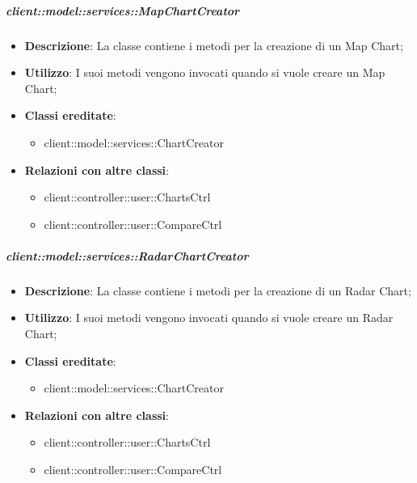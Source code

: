 		\subparagraph{client::model::services::MapChartCreator} %
		\label{subp:mapchartcreator}
			\begin{itemize}
				\item \textbf{Descrizione}: La classe contiene i metodi per la creazione di un Map Chart;
				\item \textbf{Utilizzo}: I suoi metodi vengono invocati quando si vuole creare un Map Chart;
				\item \textbf{Classi ereditate}:					
					\begin{itemize}
						\item client::model::services::ChartCreator
					\end{itemize}
				\item \textbf{Relazioni con altre classi}:					
					\begin{itemize}
						\item client::controller::user::ChartsCtrl
						\item client::controller::user::CompareCtrl
					\end{itemize}
			\end{itemize}

		\subparagraph{client::model::services::RadarChartCreator} %
		\label{subp:radarchartcreator}
			\begin{itemize}
				\item \textbf{Descrizione}: La classe contiene i metodi per la creazione di un Radar Chart;
				\item \textbf{Utilizzo}: I suoi metodi vengono invocati quando si vuole creare un Radar Chart;
				\item \textbf{Classi ereditate}:					
					\begin{itemize}
						\item client::model::services::ChartCreator
					\end{itemize}
				\item \textbf{Relazioni con altre classi}:					
					\begin{itemize}
						\item client::controller::user::ChartsCtrl
						\item client::controller::user::CompareCtrl
					\end{itemize}
			\end{itemize}

